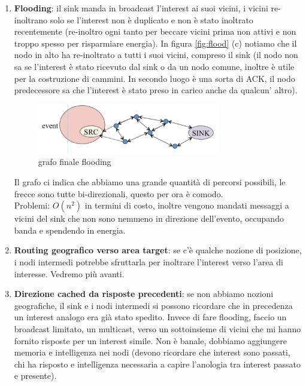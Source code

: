 \documentclass[12pt,italian]{report}
\begin{document}
\begin{enumerate}
    \item \textbf{Flooding}: il sink manda in broadcast l'interest ai suoi vicini, i vicini re-inoltrano solo se l'interest non è duplicato e non è stato inoltrato recentemente (re-inoltro ogni tanto per beccare vicini prima non attivi e non troppo spesso per risparmiare energia). 
    In figura \ref{fig:flood} (c) notiamo che il nodo in alto ha re-inoltrato a tutti i suoi vicini, compreso il sink (il nodo non sa se l'interest è stato ricevuto dal sink o da un nodo comune, inoltre è utile per la costruzione di cammini. In secondo luogo è una sorta di ACK, il nodo predecessore sa che l'interest è stato preso in carico anche da qualcun' altro). 
    
    \begin{figure}[h]
	\centering
    \includegraphics[width=80mm]{img/r4.PNG}
    \caption{grafo finale flooding}
    \label{fig:grflood}
    \end{figure}

    Il grafo ci indica che abbiamo una grande quantità di percorsi possibili, le frecce sono tutte bi-direzionali, questo per ora è comodo. \\
    Problemi: $O(n^2)$ in termini di costo, inoltre vengono mandati messaggi a vicini del sink che non sono nemmeno in direzione dell'evento, occupando banda e spendendo in energia. 
    \item \textbf{Routing geografico verso area target}: se c'è qualche nozione di posizione, i nodi intermedi potrebbe sfruttarla per inoltrare l'interest verso l'area di interesse. Vedremo più avanti. 
    \item \textbf{Direzione cached da risposte precedenti}: se non abbiamo nozioni geografiche, il sink e i nodi intermedi si possono ricordare che in precedenza un interest analogo era già stato spedito. Invece di fare flooding, faccio un broadcast limitato, un multicast, verso un sottoinsieme di vicini che mi hanno fornito risposte per un interest simile. Non è banale, dobbiamo aggiungere memoria e intelligenza nei nodi (devono ricordare che interest sono passati, chi ha risposto e intelligenza necessaria a capire l'anologia tra interest passato e presente). 
\end{enumerate}
\end{document}
